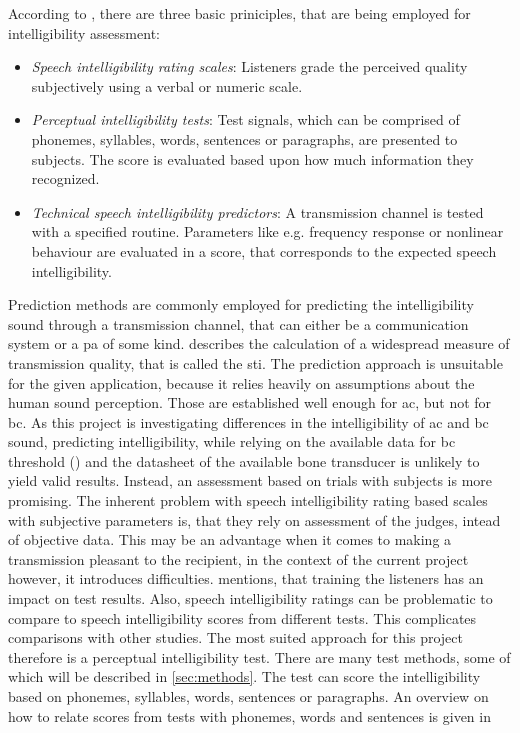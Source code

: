 According to \citep{arl_us_army}, there are three basic priniciples, that are being employed for intelligibility assessment:
\begin{itemize}
\item \textit{Speech intelligibility rating scales}: Listeners grade the perceived quality subjectively using a verbal or numeric scale.
\item \textit{Perceptual intelligibility tests}:  Test signals, which can be comprised of phonemes, syllables, words, sentences or paragraphs, are presented to subjects. The score is evaluated based upon how much information they recognized.
\item \textit{Technical speech intelligibility predictors}: A transmission channel is tested with a specified routine. Parameters like e.g. frequency response or nonlinear behaviour are evaluated in a score, that corresponds to the expected speech intelligibility.
\end{itemize}
Prediction methods are commonly employed for predicting the intelligibility sound through a transmission channel, that can either be a communication system or a \gls{pa} of some kind. \citep{iec_60268} describes the calculation of a widespread measure of transmission quality, that is called the \gls{sti}. 
The prediction approach is unsuitable for the given application, because it relies heavily on assumptions about the human sound perception. Those are established well enough for \gls{ac}, but not for \gls{bc}. As this project is investigating differences in the intelligibility of \gls{ac} and \gls{bc} sound, predicting intelligibility, while relying on the available data for \gls{bc} threshold (\citep{iso_389-3}) and the datasheet of the available bone transducer is unlikely to yield valid results.
Instead, an assessment based on trials with subjects is more promising.
The inherent problem with speech intelligibility rating based scales with subjective parameters is, that they rely on assessment of the judges, intead of objective data. This may be an advantage when it comes to making a transmission pleasant to the recipient, in the context of the current project however, it introduces difficulties.
\citep[Sec. 5.1]{arl_us_army} mentions, that training the listeners has an impact on test results. Also, speech intelligibility ratings can be problematic to compare to speech intelligibility scores from different tests. This complicates comparisons with other studies.
The most suited approach for this project therefore is a perceptual intelligibility test. There are many test methods, some of which will be described in \autoref{sec:methods}. The test can score the intelligibility based on phonemes, syllables, words, sentences or paragraphs. An overview on how to relate scores from tests with phonemes, words and sentences is given in \citep{olsen_1997}

